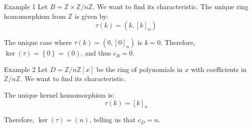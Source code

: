 \documentclass[a4paper]{article}
\begin{document}
\begin{parag}{Example 1}
    Let $B = \mathbb{Z} \times \mathbb{Z}/n\mathbb{Z}$. We want to find its characteristic. The unique ring homomorphism from $\mathbb{Z}$ is given by: 
    \[\tau\left(k\right) = \left(k, \left[k\right]_n\right)\]
    
    The unique case where $\tau\left(k\right) = \left(0, \left[0\right]_n\right)$ is $k = 0$. Therefore, $\ker\left(\tau\right) = \left\{0\right\} = \left(0\right)$, and thus $c_B = 0$.
\end{parag}

\begin{parag}{Example 2}
    Let $D = \mathbb{Z}/n\mathbb{Z}\left[x\right]$ be the ring of polynomials in $x$ with coefficients in $\mathbb{Z}/n\mathbb{Z}$. We want to find its characteristic.

    The unique kernel homomorphism is: 
    \[\tau\left(k\right) = \left[k\right]_n\]
    
    Therefore, $\ker\left(\tau\right) = \left(n\right)$, telling us that $c_D = n$.
\end{parag}
\end{document}
